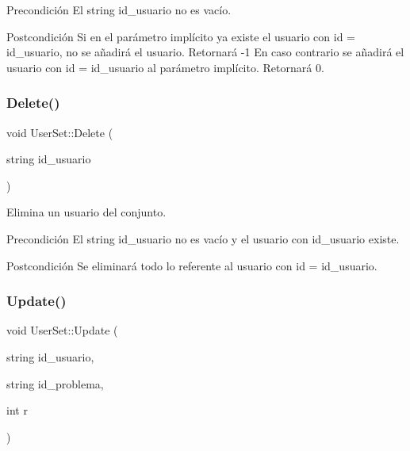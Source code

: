 \begin{DoxyPrecond}{Precondición}
El string id\+\_\+usuario no es vacío. 
\end{DoxyPrecond}
\begin{DoxyPostcond}{Postcondición}
Si en el parámetro implícito ya existe el usuario con id = id\+\_\+usuario, no se añadirá el usuario. Retornará -\/1 En caso contrario se añadirá el usuario con id = id\+\_\+usuario al parámetro implícito. Retornará 0. 
\end{DoxyPostcond}
\mbox{\label{class_user_set_a9a548c48abafd33e8460d9e8a9e40170}} 
\subsubsection{\texorpdfstring{Delete()}{Delete()}}
{\footnotesize\ttfamily void User\+Set\+::\+Delete (\begin{DoxyParamCaption}\item[{string}]{id\+\_\+usuario }\end{DoxyParamCaption})}



Elimina un usuario del conjunto. 

\begin{DoxyPrecond}{Precondición}
El string id\+\_\+usuario no es vacío y el usuario con id\+\_\+usuario existe. 
\end{DoxyPrecond}
\begin{DoxyPostcond}{Postcondición}
Se eliminará todo lo referente al usuario con id = id\+\_\+usuario. 
\end{DoxyPostcond}
\mbox{\label{class_user_set_aff81874263edfa786d5bf6f4f17c0425}} 
\subsubsection{\texorpdfstring{Update()}{Update()}}
{\footnotesize\ttfamily void User\+Set\+::\+Update (\begin{DoxyParamCaption}\item[{string}]{id\+\_\+usuario,  }\item[{string}]{id\+\_\+problema,  }\item[{int}]{r }\end{DoxyParamCaption})}



